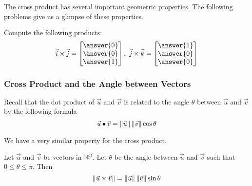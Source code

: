 \documentclass{ximera}
\begin{document}
The cross product has several important geometric properties. The following problems give us a glimpse of these properties.
 
\begin{exploration}\label{init:ijkcrossproducts}
Compute the following products:
$$\vec{i}\times\vec{j}=\begin{bmatrix}\answer{0}\\\answer{0}\\\answer{1}\end{bmatrix},\quad\vec{j}\times\vec{k}=\begin{bmatrix}\answer{1}\\\answer{0}\\\answer{0}\end{bmatrix}$$
 
\end{exploration}
 
\subsubsection*{Cross Product and the Angle between Vectors}
Recall that the dot product of $\vec{u}$ and $\vec{v}$ is related to the angle $\theta$ between $\vec{u}$ and $\vec{v}$ by the following formula
\begin{align}\label{eq:dotproductformula}\vec{u}\bullet\vec{v}=\left\|\vec{u}\right\|\left\|\vec{v}\right\|\cos\theta\end{align}

We have a very similar property for the cross product.
 
\begin{theorem}\label{th:crossproductsin}
Let $\vec{u}$ and $\vec{v}$ be vectors in $\mathbb{R}^3$. Let $\theta$ be the angle between $\vec{u}$ and $\vec{v}$ such that $0\leq\theta\leq \pi$. Then
$$\left\|\vec{u}\times\vec{v}\right\|=\left\|\vec{u}\right\|\left\|\vec{v}\right\|\sin\theta$$
\end{theorem}
\end{document}
